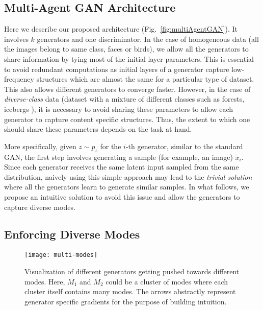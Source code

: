 \subsection{Multi-Agent GAN Architecture}
\label{subsection:architecture}
Here we describe our proposed architecture (Fig.~\ref{fig:multiAgentGAN}). It involves $k$ generators and one discriminator. In the case of homogeneous data (all the images belong to same class, \eg faces or birds), we allow all the generators to share information by tying most of the initial layer parameters. This is essential to avoid redundant computations as initial layers of a generator capture low-frequency structures which are almost the same for a particular type of dataset. This also allows different generators to converge faster. However, in the case of {\em diverse-class} data (\eg dataset with a mixture of different classes such as forests, icebergs \etc), it is necessary to avoid sharing these parameters to allow each generator to capture content specific structures. Thus, the extent to which one should share these parameters depends on the task at hand. 

More specifically, given $z \sim p_z$ for the $i$-th generator, similar to the standard GAN, the first step involves generating a sample (for example, an image) $\tilde{x}_i$. Since each generator receives the same latent input sampled from the same distribution, naively using this simple approach may lead to the {\em trivial solution} where all the generators learn to generate similar samples. In what follows, we propose an intuitive solution to avoid this issue and allow the generators to capture diverse modes.


\subsection{Enforcing Diverse Modes}
\label{sec:diverseModes}
\begin{figure}
	\centering
	\texttt{[image: multi-modes]}
	\caption{Visualization of different generators getting pushed towards different modes. Here, $M_1$ and $M_2$ could be a cluster of modes where each cluster itself contains many modes. The arrows abstractly represent generator specific gradients for the purpose of building intuition.}
	\label{fig:modeVisualization}
	\vspace{-4mm}
\end{figure}

